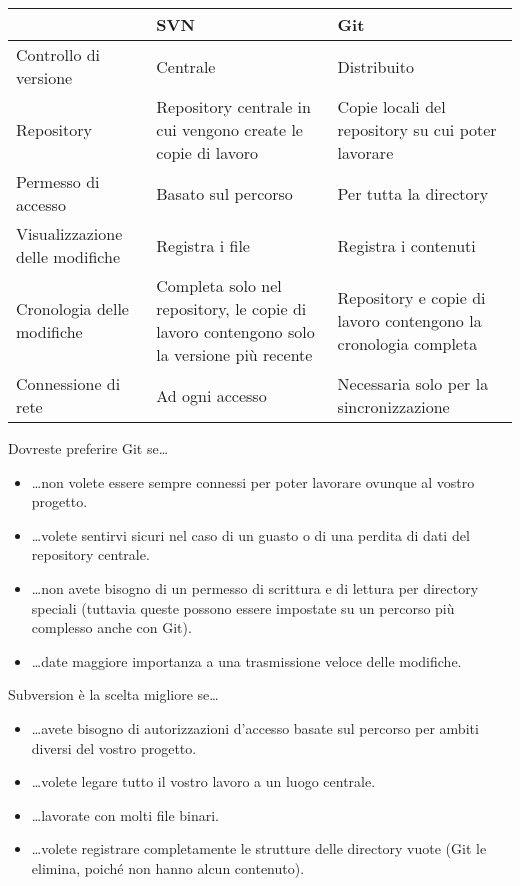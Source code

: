 \begin{table}[H]
\centering
\begin{tabular}{|C{3.5cm}|C{4cm}|C{4cm}|}
\hline
& \textbf{SVN} & \textbf{Git} \\
\hline
Controllo di versione & Centrale & Distribuito \\
\hline
Repository & Repository centrale in cui vengono create le copie di lavoro & Copie locali del repository su cui poter lavorare \\
\hline
Permesso di accesso & Basato sul percorso & Per tutta la directory \\
\hline
Visualizzazione delle modifiche & Registra i file & Registra i contenuti \\
\hline
Cronologia delle modifiche & Completa solo nel repository, le copie di lavoro contengono solo la versione più recente & Repository e copie di lavoro contengono la cronologia completa \\
\hline
Connessione di rete & Ad ogni accesso & Necessaria solo per la sincronizzazione \\
\hline
\end{tabular}
\end{table}
Dovreste preferire Git se…
\begin{itemize}
\item …non volete essere sempre connessi per poter lavorare ovunque al vostro progetto. 
\item …volete sentirvi sicuri nel caso di un guasto o di una perdita di dati del repository centrale.
\item …non avete bisogno di un permesso di scrittura e di lettura per directory speciali (tuttavia queste possono essere impostate su un percorso più complesso anche con Git).
\item …date maggiore importanza a una trasmissione veloce delle modifiche.
\end{itemize}
Subversion è la scelta migliore se…
\begin{itemize}
\item …avete bisogno di autorizzazioni d’accesso basate sul percorso per ambiti diversi del vostro progetto.
\item …volete legare tutto il vostro lavoro a un luogo centrale.
\item …lavorate con molti file binari.
\item …volete registrare completamente le strutture delle directory vuote (Git le elimina, poiché non hanno alcun contenuto).
\end{itemize}


